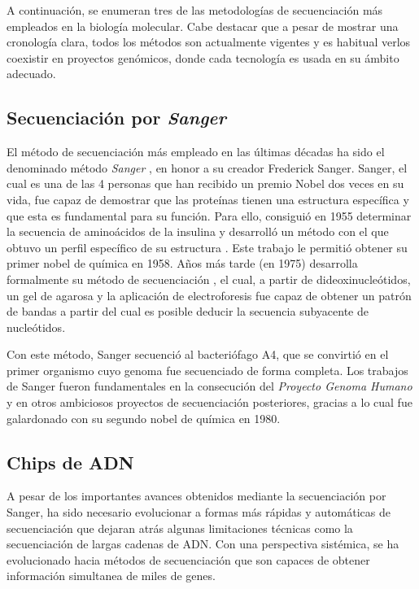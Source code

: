 \medskip
A continuación, se enumeran tres de las metodologías de secuenciación más empleados en la biología molecular. Cabe destacar que a pesar de mostrar una cronología clara, todos los métodos son actualmente vigentes y es habitual verlos coexistir en proyectos genómicos, donde cada tecnología es usada en su ámbito adecuado. 


\subsection{Secuenciación por \emph{Sanger}}

El método de secuenciación más empleado en las últimas décadas ha sido el denominado método \emph{Sanger} \cite{sanger}, en honor a su creador Frederick Sanger. Sanger, el cual es una de las 4 personas que han recibido un premio Nobel dos veces en su vida, fue capaz de demostrar que las proteínas tienen una estructura específica y que esta es fundamental para su función. Para ello, consiguió en 1955 determinar la secuencia de aminoácidos de la insulina y desarrolló un método con el que obtuvo un perfil específico de su estructura \cite{sanger_estructura}. Este trabajo le permitió obtener su primer nobel de química en 1958. Años más tarde (en 1975) desarrolla formalmente su método de secuenciación \cite{Sanger1977}, el cual, a partir de dideoxinucleótidos, un gel de agarosa y la aplicación de electroforesis fue capaz de obtener un patrón de bandas a partir del cual es posible deducir la secuencia subyacente de nucleótidos. 

\medskip
Con este método, Sanger secuenció al bacteriófago A4, que se convirtió en el primer organismo cuyo genoma fue secuenciado de forma completa. Los trabajos de Sanger fueron fundamentales en la consecución del \emph{Proyecto Genoma Humano} y en otros ambiciosos proyectos de secuenciación posteriores, gracias a lo cual fue galardonado con su segundo nobel de química en 1980. 

\subsection{Chips de ADN}

A pesar de los importantes avances obtenidos mediante la secuenciación por Sanger, ha sido necesario evolucionar a formas más rápidas y automáticas de secuenciación que dejaran atrás algunas limitaciones técnicas como la secuenciación de largas cadenas de ADN. Con una perspectiva sistémica, se ha evolucionado hacia métodos de secuenciación que son capaces de obtener información simultanea de miles de genes. 

